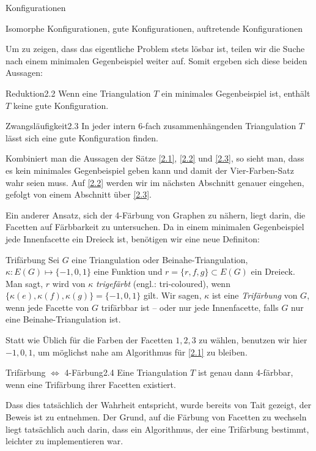 \begin{section}{Konfigurationen}
\begin{definition}{Isomorphe Konfigurationen, gute Konfigurationen, auftretende Konfigurationen}
 \end{definition}

   
 Um zu zeigen, dass das eigentliche Problem stets lösbar ist, teilen wir die Suche nach einem minimalen Gegenbeispiel weiter auf. Somit ergeben sich diese beiden Aussagen:
   
 \begin{satzl}{Reduktion}{2.2}
  Wenn eine Triangulation $T$ ein minimales Gegenbeispiel ist, enthält $T$ keine gute Konfiguration.
 \end{satzl}
   
 \begin{satzl}{Zwangsläufigkeit}{2.3}
  In jeder intern 6-fach zusammenhängenden Triangulation $T$ lässt sich eine gute Konfiguration finden.
 \end{satzl}
   
 Kombiniert man die Aussagen der Sätze \ref{2.1}, \ref{2.2} und \ref{2.3}, so sieht man, dass es kein minimales Gegenbeispiel geben kann und damit der Vier-Farben-Satz wahr seien muss. Auf \ref{2.2} werden wir im nächsten Abschnitt genauer eingehen, gefolgt von einem Abschnitt über \ref{2.3}. 
 
 Ein anderer Ansatz, sich der 4-Färbung von Graphen zu nähern, liegt darin, die Facetten auf Färbbarkeit zu untersuchen. Da in einem minimalen Gegenbeispiel jede Innenfacette ein Dreieck ist, benötigen wir eine neue Definiton:
 
 \begin{definition}{Trifärbung}
  Sei $G$ eine Triangulation oder Beinahe-Triangulation, $\kappa:E(G) \mapsto \{-1,0,1\}$ eine Funktion und $r=\{r,f,g\} \subset E(G)$ ein Dreieck. Man sagt, $r$ wird von $\kappa$ \textit{trigefärbt} (engl.: tri-coloured), wenn $\{\kappa(e),\kappa(f),\kappa(g)\} = \{-1,0,1\}$ gilt. Wir sagen, $\kappa$ ist eine \textit{Trifärbung} von $G$, wenn jede Facette von $G$ trifärbbar ist -- oder nur jede Innenfacette, falls $G$ nur eine Beinahe-Triangulation ist.
 \end{definition}

 Statt wie Üblich für die Farben der Facetten $1,2,3$ zu wählen, benutzen wir hier $-1,0,1$, um möglichst nahe am Algorithmus für \ref{2.1} zu bleiben.
 
 \begin{satzl}{Trifärbung $\Leftrightarrow$ 4-Färbung}{2.4}
  Eine Triangulation $T$ ist genau dann 4-färbbar, wenn eine Trifärbung ihrer Facetten existiert.
 \end{satzl}
 
 Dass dies tatsächlich der Wahrheit entspricht, wurde bereits von Tait gezeigt, der Beweis ist \cite{TaitTri} zu entnehmen. Der Grund, auf die Färbung von Facetten zu wechseln liegt tatsächlich auch darin, dass ein Algorithmus, der eine Trifärbung bestimmt, leichter zu implementieren war. \cite[Seite 7]{FourRSST} 
 

\end{section}
